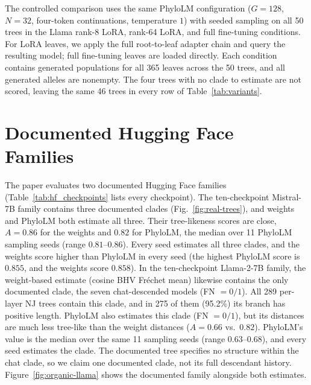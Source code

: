 \documentclass{article}
\theoremstyle{definition}
\theoremstyle{plain}
\newif\ifrevision
\newcommand{\rev}[1]{\ifrevision{\color{blue}#1}\else#1\fi}
\newcommand{\revtag}[1]{\ifrevision\textsuperscript{\color{blue}\sffamily\scriptsize[#1]}\fi}
\begin{document}
The controlled comparison uses the same PhyloLM configuration ($G=128$, $N=32$, four-token
continuations, temperature $1$) with seeded sampling on all 50 trees in the Llama
rank-8 LoRA, rank-64 LoRA, and full fine-tuning conditions. For LoRA leaves, we apply the full
root-to-leaf adapter chain and query the resulting model; full fine-tuning leaves are loaded directly. Each condition
contains generated populations for all 365 leaves across the 50 trees, and all generated alleles are
nonempty. The four trees with no clade to estimate are not scored, leaving the same 46 trees in every row of Table~\ref{tab:variants}.

\section{Documented Hugging Face Families}
\label{app:organic-additional}

The paper evaluates two documented Hugging Face families (Table~\ref{tab:hf_checkpoints} lists every checkpoint). The ten-checkpoint Mistral-7B family
contains three documented clades (Fig.~\ref{fig:real-trees}), and weights and PhyloLM both estimate
all three. \rev{Their tree-likeness scores are close, $A=0.86$ for the weights and $0.82$ for PhyloLM, the median
over 11 PhyloLM sampling seeds (range $0.81$--$0.86$). Every seed estimates all three clades, and the weights score higher
than PhyloLM in every seed (the highest PhyloLM score is $0.855$, and the weights score $0.858$).}\revtag{Corr.} In the ten-checkpoint Llama-2-7B family, the weight-based estimate (cosine BHV Fr\'echet mean) likewise contains
the only documented clade, the seven chat-descended models (FN $=0/1$)\rev{. All 289 per-layer NJ trees contain this clade, and in 275 of them (95.2\%) its branch has positive length}\revtag{Corr.}. PhyloLM also estimates this clade (FN $=0/1$), but its
distances are much less tree-like than the weight distances ($A=\rev{0.66}$ vs.\ $0.82$)\rev{. PhyloLM's value is the median over the same 11 sampling seeds (range $0.63$--$0.68$), and every seed estimates the clade}\revtag{Corr.}.
The documented tree specifies no structure within the chat clade, so we claim one documented clade, not its full descendant history. Figure~\ref{fig:organic-llama}
shows the documented family alongside both estimates.
\end{document}
